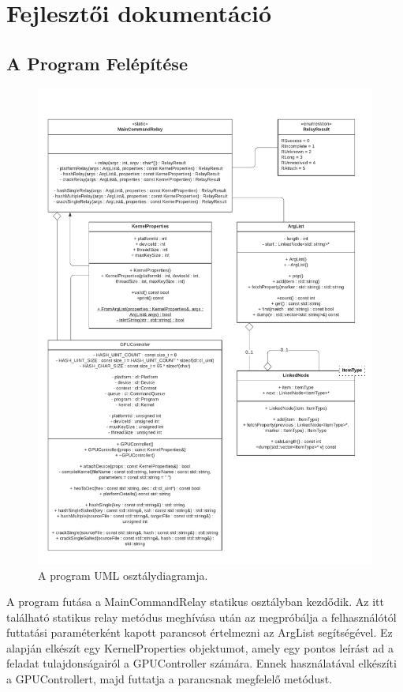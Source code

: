 \chapter{Fejlesztői dokumentáció}
\label{ch:impl}


\section{A Program Felépítése}


\begin{figure}%
    \centering 
    \includegraphics[width=\textwidth]{images/diagrams/uml-class.pdf}
    \caption{A program UML osztálydiagramja.}
\end{figure}

A program futása a MainCommandRelay statikus osztályban kezdődik. Az itt található statikus relay metódus meghívása után az megpróbálja a felhasználótól futtatási paraméterként kapott parancsot értelmezni az ArgList segítségével. Ez alapján elkészít egy KernelProperties objektumot, amely egy pontos leírást ad a feladat tulajdonságairól a GPUController számára. Ennek használatával elkészíti a GPUControllert, majd futtatja a parancsnak megfelelő metódust.

